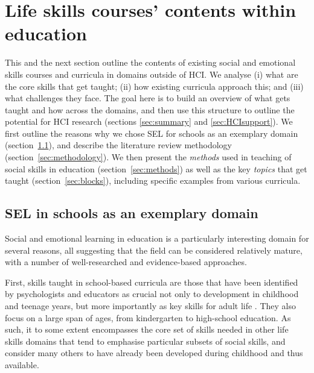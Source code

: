 \documentclass[prodmode,acmtochi]{acmsmall}
\newcommand{\rephrase}[1]{\textrm{\textrm{\textcolor{gray}{#1}}}}
\begin{document}
\section{Life skills courses' contents within education}
\label{sec:SEL}

        This and the next section outline the contents of existing social and emotional skills courses and curricula in domains outside of HCI. We analyse (i) what are the core skills that get taught; (ii) how  existing curricula approach this; and (iii) what challenges they face.    The goal here is to build an overview of what gets taught and how across the domains, and then use this structure to outline the potential for HCI research (sections \ref{sec:summary} and \ref{sec:HCIsupport}). 
%
        We first outline the reasons why we chose SEL for schools as an exemplary domain (section~\ref{sec:reasons}), and describe the literature review methodology (section~\ref{sec:methodology}).
        We then present the \emph{methods} used in teaching of social skills in education (section~\ref{sec:methods})  as well as the key \emph{topics} that  get taught (section~\ref{sec:blocks}), including specific examples from various curricula. %


\subsection{SEL in schools as an exemplary domain}
\label{sec:reasons}
Social and emotional learning in education is a particularly interesting domain for several reasons, all suggesting that the field can be considered relatively mature, with a number of well-researched and evidence-based approaches. 

First, skills taught in school-based curricula are those that have been identified by psychologists and educators as crucial not only to development in childhood and teenage years, but more importantly as key skills for adult life \cite{Greenberg2010}. They also focus on a large span of ages, from kindergarten to high-school education. As such, it to some extent encompasses the core set of skills needed in other life skills domains that tend to emphasise particular subsets of social skills, and consider many others to have already been developed during childhood and thus available. %
\end{document}
